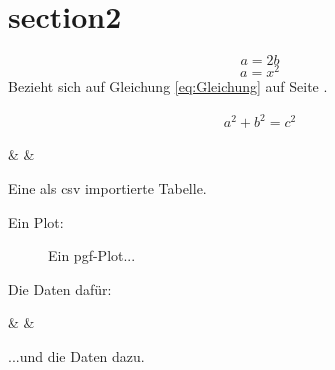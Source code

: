 \section{section2}
	\lipsum[4]
	
	\begin{equation}\label{eq:Gleichung}
		a=2b
	\end{equation}
	\begin{equation}
		a=x^2
	\end{equation}
	Bezieht sich auf Gleichung \ref{eq:Gleichung} auf Seite \pageref{eq:Gleichung}.
	
	\begin{thm}[Pythagoras]\label{thm:Pythagoras}
		\begin{gather}
			a^2 + b^2 = c^2
		\end{gather}	
	\end{thm}
	
	\begin{table}[h] %
		\centering	
		{\thecsvrow & \name & \surname}%
		\caption[CSV Import]{Eine als csv importierte Tabelle.}
		\label{tab:Tabelle1}
	\end{table}

	\lipsum[1]

	\newpage
	
	Ein Plot:
	\begin{figure}[h]
		\centering
		\scalebox{.8}{}
		\caption{Ein pgf-Plot...}
		\label{fig:pgfplot}
	\end{figure}
	
	Die Daten dafür:
	\begin{table}[h] %
		\centering	
		{\thecsvrow & \x & \y}%
		\caption[Daten]{...und die Daten dazu.}
		\label{tab:pgfplot}
	\end{table}
	

%
%
%
%
%
	